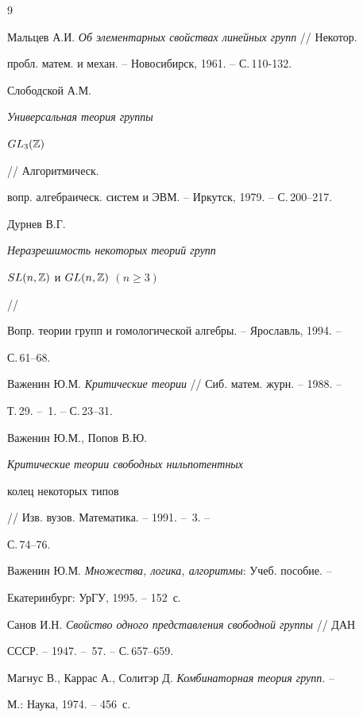 \begin{thebibliography}{9} 


 




Мальцев А.И. {\em Об элементарных свойствах линейных групп} // Некотор. 


пробл. матем. и механ. -- Новосибирск, 1961. -- С.\,110-132. 




Слободской А.М. {\em Универсальная теория группы 


$GL_3(\Bbb Z)$} // Алгоритмическ. 


вопр. алгебраическ. систем и ЭВМ. -- Иркутск, 1979. -- С.\,200--217. 




Дурнев В.Г. {\em Неразрешимость некоторых теорий групп 


$SL(n,\Bbb Z)$ и $GL(n,\Bbb Z)$ $(n\ge 3)$} // 


Вопр. теории групп и гомологической алгебры. -- Ярославль, 1994. -- 


С.\,61--68. 




Важенин Ю.М. {\em Критические теории} // Сиб. матем. журн. -- 1988. -- 


Т.\,29. -- \No\,1. -- С.\,23--31. 




Важенин Ю.М., Попов В.Ю. {\em Критические теории свободных нильпотентных 


колец некоторых типов} // Изв. вузов. Математика. -- 1991. -- \No\,3. -- 


С.\,74--76. 




Важенин Ю.М. {\em Множества, логика, алгоритмы}: Учеб. пособие. -- 


Екатеринбург: УрГУ, 1995. -- 152~с. 




Санов И.Н. {\em Свойство одного представления свободной группы} // ДАН 


СССР. -- 1947. -- \No\,57. -- С.\,657--659. 




Магнус В., Каррас А., Солитэр Д. {\em Комбинаторная теория групп}. -- 


М.: Наука, 1974. -- 456~с. 


 


 


\end{thebibliography} 


 


\vskip 2cm 


 








 


\label{end} 


 


